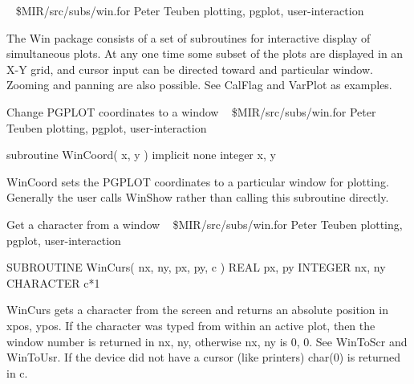 \newline \ 
\newline {} \$MIR/src/subs/win.for
\newline {} Peter Teuben
\newline {} plotting, pgplot, user-interaction
\par{\tenpoint
{\eightpoint\begintt
 The Win package consists of a set of subroutines for interactive
 display of simultaneous plots.  At any one time some subset of the plots are
 displayed in an X-Y grid, and cursor input can be directed toward and
 particular window.  Zooming and panning are also possible.  See CalFlag and
 VarPlot as examples.
\endtt}
\par}
%
\noindent Change PGPLOT coordinates to a window
\newline \ 
\newline {} \$MIR/src/subs/win.for
\newline {} Peter Teuben
\newline \abox{Keywords:} plotting, pgplot, user-interaction
\par{\tenpoint
{\eightpoint\begintt
        subroutine WinCoord( x, y )
        implicit none
        integer x, y

    WinCoord sets the PGPLOT coordinates to a particular window for
    plotting.  Generally the user calls WinShow rather than calling this
    subroutine directly.
\endtt}
\par}
%
\noindent Get a character from a window
\newline \ 
\newline {} \$MIR/src/subs/win.for
\newline \abox{Responsible:} Peter Teuben
\newline {} plotting, pgplot, user-interaction
\par{\tenpoint
{\eightpoint\begintt
        SUBROUTINE WinCurs( nx, ny, px, py, c )
        REAL      px, py
        INTEGER   nx, ny
        CHARACTER c*1

    WinCurs gets a character from the screen and returns an absolute
    position in {xpos, ypos}.  If the character was typed from within
    an active plot, then the window number is returned in {nx, ny},
    otherwise {nx, ny} is {0, 0}.  See WinToScr and WinToUsr.
    If the device did not have a cursor (like printers) char(0) is
    returned in c.
\endtt}
\par}
%
